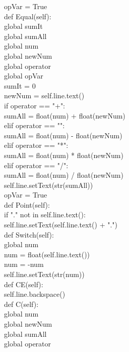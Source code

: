         opVar = True\\

    def Equal(self):\\
        global sumIt\\
        global sumAll\\
        global num\\
        global newNum\\
        global operator\\
        global opVar\\

        sumIt = 0\\

        newNum = self.line.text()\\

        if operator == "+":\\
            sumAll = float(num) + float(newNum)\\
        elif operator == "\-":\\
            sumAll = float(num) - float(newNum)\\
        elif operator == "*":\\
            sumAll = float(num) * float(newNum)\\
        elif operator == "/":\\
            sumAll = float(num) / float(newNum)\\
 self.line.setText(str(sumAll))\\
        opVar = True\\

    def Point(self):\\

        if "." not in self.line.text():\\
            self.line.setText(self.line.text() + ".")\\

    def Switch(self):\\
        global num\\

        num = float(self.line.text())\\
        num = -num\\
        self.line.setText(str(num))\\

    def CE(self):\\
        self.line.backspace()\\

    def C(self):\\
        global num\\
        global newNum\\
        global sumAll\\
        global operator\\

